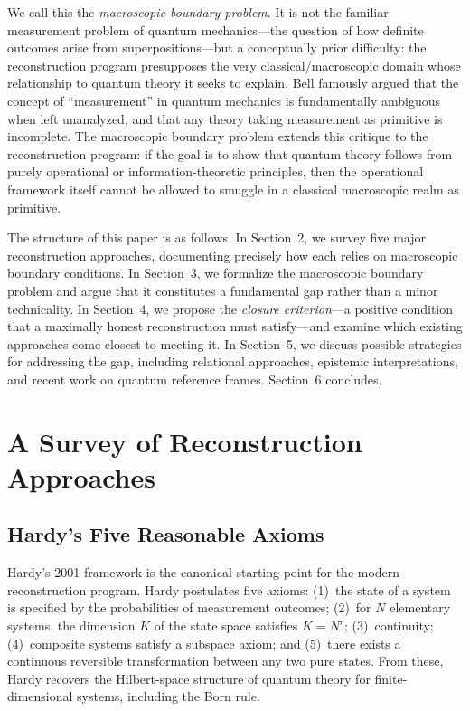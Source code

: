\documentclass[12pt,a4paper,twoside]{article}
\begin{document}
We call this the \emph{macroscopic boundary problem}. It is not the familiar measurement problem of quantum mechanics---the question of how definite outcomes arise from superpositions---but a conceptually prior difficulty: the reconstruction program presupposes the very classical/macroscopic domain whose relationship to quantum theory it seeks to explain. Bell \cite{Bell1990} famously argued that the concept of ``measurement'' in quantum mechanics is fundamentally ambiguous when left unanalyzed, and that any theory taking measurement as primitive is incomplete. The macroscopic boundary problem extends this critique to the reconstruction program: if the goal is to show that quantum theory follows from purely operational or information-theoretic principles, then the operational framework itself cannot be allowed to smuggle in a classical macroscopic realm as primitive.

The structure of this paper is as follows. In Section~2, we survey five major reconstruction approaches, documenting precisely how each relies on macroscopic boundary conditions. In Section~3, we formalize the macroscopic boundary problem and argue that it constitutes a fundamental gap rather than a minor technicality. In Section~4, we propose the \emph{closure criterion}---a positive condition that a maximally honest reconstruction must satisfy---and examine which existing approaches come closest to meeting it. In Section~5, we discuss possible strategies for addressing the gap, including relational approaches, epistemic interpretations, and recent work on quantum reference frames. Section~6 concludes.

\section{A Survey of Reconstruction Approaches}

\subsection{Hardy's Five Reasonable Axioms}

Hardy's 2001 framework \cite{Hardy2001} is the canonical starting point for the modern reconstruction program. Hardy postulates five axioms: (1)~the state of a system is specified by the probabilities of measurement outcomes; (2)~for $N$ elementary systems, the dimension $K$ of the state space satisfies $K = N^r$; (3)~continuity; (4)~composite systems satisfy a subspace axiom; and (5)~there exists a continuous reversible transformation between any two pure states. From these, Hardy recovers the Hilbert-space structure of quantum theory for finite-dimensional systems, including the Born rule.
\end{document}
